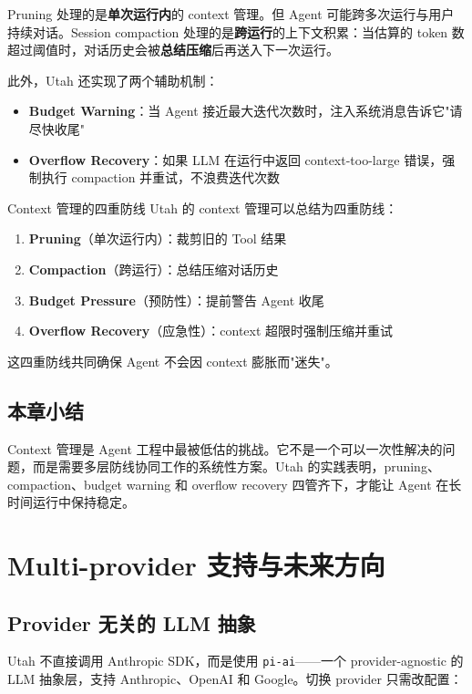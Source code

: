 \documentclass[a4paper]{article}
\begin{document}
Pruning 处理的是\textbf{单次运行内}的 context 管理。但 Agent 可能跨多次运行与用户持续对话。Session compaction 处理的是\textbf{跨运行}的上下文积累：当估算的 token 数超过阈值时，对话历史会被\textbf{总结压缩}后再送入下一次运行。

此外，Utah 还实现了两个辅助机制：

\begin{itemize}
    \item \textbf{Budget Warning}：当 Agent 接近最大迭代次数时，注入系统消息告诉它"请尽快收尾"
    \item \textbf{Overflow Recovery}：如果 LLM 在运行中返回 context-too-large 错误，强制执行 compaction 并重试，不浪费迭代次数
\end{itemize}

\begin{knowledgebox}{Context 管理的四重防线}
Utah 的 context 管理可以总结为四重防线：
\begin{enumerate}
    \item \textbf{Pruning}（单次运行内）：裁剪旧的 Tool 结果
    \item \textbf{Compaction}（跨运行）：总结压缩对话历史
    \item \textbf{Budget Pressure}（预防性）：提前警告 Agent 收尾
    \item \textbf{Overflow Recovery}（应急性）：context 超限时强制压缩并重试
\end{enumerate}
这四重防线共同确保 Agent 不会因 context 膨胀而"迷失"。
\end{knowledgebox}

\subsection{本章小结}

Context 管理是 Agent 工程中最被低估的挑战。它不是一个可以一次性解决的问题，而是需要多层防线协同工作的系统性方案。Utah 的实践表明，pruning、compaction、budget warning 和 overflow recovery 四管齐下，才能让 Agent 在长时间运行中保持稳定。


\section{Multi-provider 支持与未来方向}

\subsection{Provider 无关的 LLM 抽象}

Utah 不直接调用 Anthropic SDK，而是使用 \texttt{pi-ai}——一个 provider-agnostic 的 LLM 抽象层，支持 Anthropic、OpenAI 和 Google。切换 provider 只需改配置：
\end{document}
